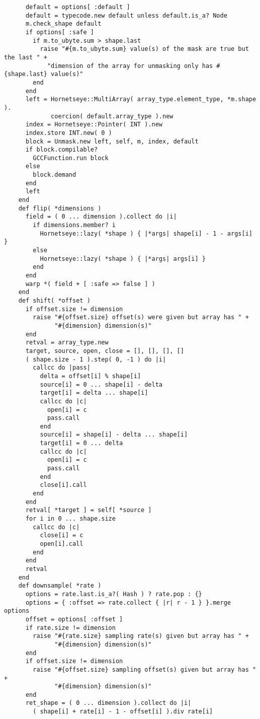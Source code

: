 \begin{lstlisting}
      default = options[ :default ]
      default = typecode.new default unless default.is_a? Node
      m.check_shape default
      if options[ :safe ]
        if m.to_ubyte.sum > shape.last
          raise "#{m.to_ubyte.sum} value(s) of the mask are true but the last " +
            "dimension of the array for unmasking only has #{shape.last} value(s)"
        end
      end
      left = Hornetseye::MultiArray( array_type.element_type, *m.shape ).
             coercion( default.array_type ).new
      index = Hornetseye::Pointer( INT ).new
      index.store INT.new( 0 )
      block = Unmask.new left, self, m, index, default
      if block.compilable?
        GCCFunction.run block
      else
        block.demand
      end
      left
    end
    def flip( *dimensions )
      field = ( 0 ... dimension ).collect do |i|
        if dimensions.member? i
          Hornetseye::lazy( *shape ) { |*args| shape[i] - 1 - args[i] }
        else
          Hornetseye::lazy( *shape ) { |*args| args[i] }
        end
      end
      warp *( field + [ :safe => false ] )
    end
    def shift( *offset )
      if offset.size != dimension
        raise "#{offset.size} offset(s) were given but array has " +
              "#{dimension} dimension(s)"
      end
      retval = array_type.new
      target, source, open, close = [], [], [], []
      ( shape.size - 1 ).step( 0, -1 ) do |i|
        callcc do |pass|
          delta = offset[i] % shape[i]
          source[i] = 0 ... shape[i] - delta
          target[i] = delta ... shape[i]
          callcc do |c|
            open[i] = c
            pass.call
          end
          source[i] = shape[i] - delta ... shape[i]
          target[i] = 0 ... delta
          callcc do |c|
            open[i] = c
            pass.call
          end
          close[i].call
        end
      end
      retval[ *target ] = self[ *source ]
      for i in 0 ... shape.size
        callcc do |c|
          close[i] = c
          open[i].call
        end
      end
      retval
    end
    def downsample( *rate )
      options = rate.last.is_a?( Hash ) ? rate.pop : {}
      options = { :offset => rate.collect { |r| r - 1 } }.merge options
      offset = options[ :offset ]
      if rate.size != dimension
        raise "#{rate.size} sampling rate(s) given but array has " +
              "#{dimension} dimension(s)"
      end
      if offset.size != dimension
        raise "#{offset.size} sampling offset(s) given but array has " +
              "#{dimension} dimension(s)"
      end
      ret_shape = ( 0 ... dimension ).collect do |i|
        ( shape[i] + rate[i] - 1 - offset[i] ).div rate[i]

\end{lstlisting}

